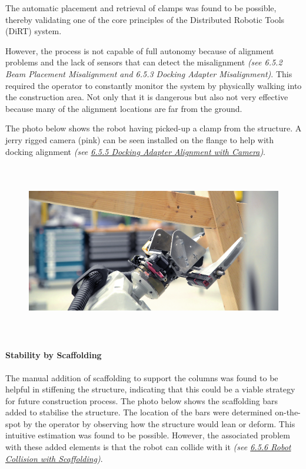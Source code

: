 \documentclass[11pt]{book}
\begin{document}
The automatic placement and retrieval of clamps was found to be possible, thereby validating one of the core principles of the Distributed Robotic Tools (DiRT) system. 

However, the process is not capable of full autonomy because of alignment problems and the lack of sensors that can detect the misalignment \textit{\textcolor[HTML]{B7B7B7}{(see 6.5.2 Beam Placement Misalignment and 6.5.3 Docking Adapter Misalignment)}}. This required the operator to constantly monitor the system by physically walking into the construction area. Not only that it is dangerous but also not very effective because many of the alignment locations are far from the ground. 

The photo below shows the robot having picked-up a clamp from the structure. A jerry rigged camera (pink) can be seen installed on the flange to help with docking alignment \textit{\textcolor[HTML]{B7B7B7}{(see \uline{6.5.5 Docking Adapter Alignment with Camera})}}. 

\begin{figure}[H]
\includegraphics[width=15.92cm,height=7.62cm]{./images/image71.png}
\end{figure}


\paragraph{Stability by Scaffolding}

The manual addition of scaffolding to support the columns was found to be helpful in stiffening the structure, indicating that this could be a viable strategy for future construction process. The photo below shows the scaffolding bars added to stabilise the structure. The location of the bars were determined on-the-spot by the operator by observing how the structure would lean or deform. This intuitive estimation was found to be possible. However, the associated problem with these added elements is that the robot can collide with it \textit{\textcolor[HTML]{B7B7B7}{(see \uline{6.5.6 Robot Collision with Scaffolding})}}.
\end{document}
